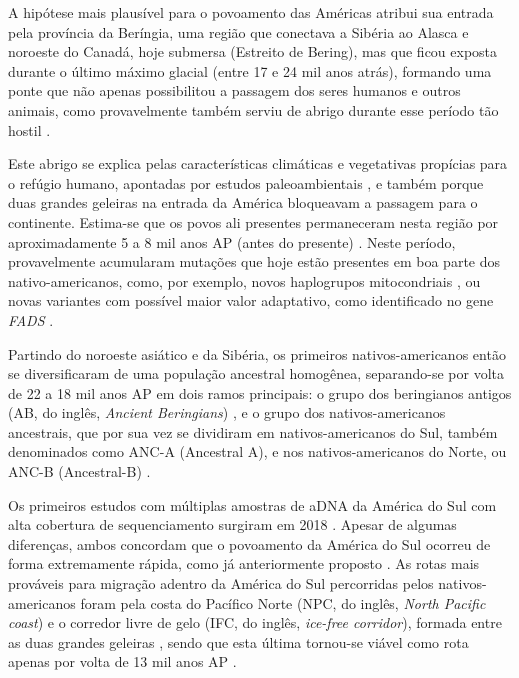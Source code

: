 A hipótese mais plausível para o povoamento das Américas atribui sua entrada pela província da Beríngia, uma região que conectava a Sibéria ao Alasca e noroeste do Canadá, hoje submersa (Estreito de Bering), mas que ficou exposta durante o último máximo glacial (entre 17 e 24 mil anos atrás), formando uma ponte que não apenas possibilitou a passagem dos seres humanos e outros animais, como provavelmente também serviu de abrigo durante esse período tão hostil \cite{hoffecker_beringia_2016,sutter_pre-columbian_2020}.

Este abrigo se explica pelas características climáticas e vegetativas propícias para o refúgio humano, apontadas por estudos paleoambientais \cite{wooller_new_2018}, e também porque duas grandes geleiras na entrada da América bloqueavam a passagem para o continente. Estima-se que os povos ali presentes permaneceram nesta região por aproximadamente 5 a 8 mil anos AP (antes do presente) \cite{fagundes_mitochondrial_2008}. Neste período, provavelmente acumularam mutações que hoje estão presentes em boa parte dos nativo-americanos, como, por exemplo, novos haplogrupos mitocondriais \cite{tamm_beringian_2007}, ou novas variantes com possível maior valor adaptativo, como identificado no gene \textsl{FADS} \cite{amorim_genetic_2017}. 

Partindo do noroeste asiático e da Sibéria, os primeiros nativos-americanos então se diversificaram de uma população ancestral homogênea, separando-se por volta de 22 a 18 mil anos AP em dois ramos principais: o grupo dos beringianos antigos (AB, do inglês, \textit{Ancient Beringians}) \cite{moreno-mayar_terminal_2018,moreno-mayar_early_2018}, e o grupo dos nativos-americanos ancestrais, que por sua vez se dividiram em nativos-americanos do Sul, também denominados como ANC-A (Ancestral A), e nos nativos-americanos do Norte, ou ANC-B (Ancestral-B) \cite{raghavan_population_2015,moreno-mayar_early_2018,posth_reconstructing_2018,scheib_ancient_2018}.

Os primeiros estudos com múltiplas amostras de aDNA da América do Sul com alta cobertura de sequenciamento surgiram em 2018 \cite{posth_reconstructing_2018,moreno-mayar_early_2018}. Apesar de algumas diferenças, ambos concordam que o povoamento da América do Sul ocorreu de forma extremamente rápida, como já anteriormente proposto \cite{llamas_ancient_2016}. As rotas mais prováveis para migração adentro da América do Sul percorridas pelos nativos-americanos foram pela costa do Pacífico Norte (NPC, do inglês, \textit{North Pacific coast}) e o corredor livre de gelo (IFC, do inglês, \textit{ice-free corridor}), formada entre as duas grandes geleiras \cite{potter_current_2018}, sendo que esta última tornou-se viável como rota apenas por volta de 13 mil anos AP \cite{pedersen_postglacial_2016}.

